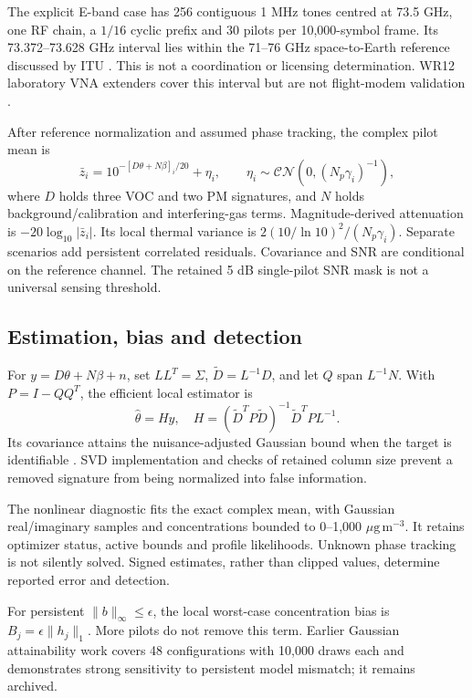 \documentclass[conference]{IEEEtran}
\newcommand{\ugm}{\ensuremath{\mu\mathrm{g\,m}^{-3}}}
\begin{document}
The explicit E-band case has 256 contiguous 1 MHz tones centred at 73.5 GHz, one RF chain, a $1/16$ cyclic prefix and 30 pilots per 10,000-symbol frame. Its 73.372--73.628 GHz interval lies within the 71--76 GHz space-to-Earth reference discussed by ITU \cite{itu178}. This is not a coordination or licensing determination. WR12 laboratory VNA extenders cover this interval but are not flight-modem validation \cite{vdi}.

After reference normalization and assumed phase tracking, the complex pilot mean is
\begin{equation}
\bar z_i=10^{-[D\theta+N\beta]_i/20}+\eta_i,\qquad
\eta_i\sim\mathcal{CN}(0,(N_p\gamma_i)^{-1}),
\end{equation}
where $D$ holds three VOC and two PM signatures, and $N$ holds background/calibration and interfering-gas terms. Magnitude-derived attenuation is $-20\log_{10}|\bar z_i|$. Its local thermal variance is $2(10/\ln10)^2/(N_p\gamma_i)$. Separate scenarios add persistent correlated residuals. Covariance and SNR are conditional on the reference channel. The retained 5 dB single-pilot SNR mask is not a universal sensing threshold.

\subsection{Estimation, bias and detection}
For $y=D\theta+N\beta+n$, set $LL^T=\Sigma$, $\widetilde D=L^{-1}D$, and let $Q$ span $L^{-1}N$. With $P=I-QQ^T$, the efficient local estimator is
\begin{equation}
\widehat\theta=Hy,\quad H=(\widetilde D^TP\widetilde D)^{-1}\widetilde D^TP L^{-1}.
\end{equation}
Its covariance attains the nuisance-adjusted Gaussian bound when the target is identifiable \cite{kay}. SVD implementation and checks of retained column size prevent a removed signature from being normalized into false information.

The nonlinear diagnostic fits the exact complex mean, with Gaussian real/imaginary samples and concentrations bounded to 0--1,000 \ugm. It retains optimizer status, active bounds and profile likelihoods. Unknown phase tracking is not silently solved. Signed estimates, rather than clipped values, determine reported error and detection.

For persistent $\|b\|_\infty\le\epsilon$, the local worst-case concentration bias is $B_j=\epsilon\|h_j\|_1$. More pilots do not remove this term. Earlier Gaussian attainability work covers 48 configurations with 10,000 draws each and demonstrates strong sensitivity to persistent model mismatch; it remains archived.
\end{document}
